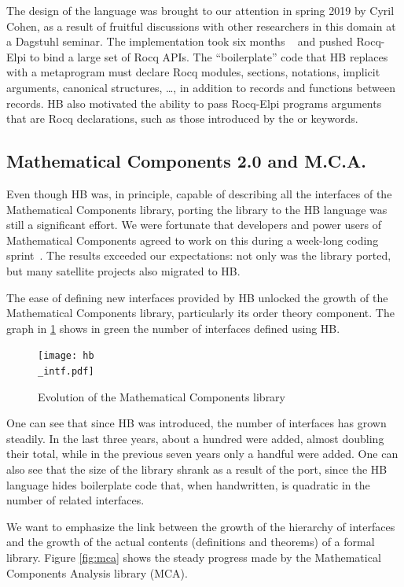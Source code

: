 \documentclass{these-ISSS}
\begin{document}
The design of the language was brought to our attention in spring 2019 by Cyril
Cohen, as a result of fruitful discussions with other researchers in this
domain at a Dagstuhl seminar. The implementation took six months
~\cite{cohen_et_al:LIPIcs.FSCD.2020.34} and pushed Rocq-Elpi to bind a large
set of Rocq APIs. The ``boilerplate'' code that HB replaces with a metaprogram
must declare Rocq modules, sections, notations, implicit arguments, canonical
structures, \ldots, in addition to records and functions between records. HB
also motivated the ability to pass Rocq-Elpi programs arguments that are Rocq
declarations, such as those introduced by the  or
 keywords.


\subsection{Mathematical Components 2.0 and M.C.A.}


Even though HB was, in principle, capable of describing all the interfaces of
the Mathematical Components library, porting the library to the HB language was
still a significant effort. We were fortunate that developers and power users
of Mathematical Components agreed to work on this during a week-long coding
sprint~\cite{affeldt:hal-03463762}. The results exceeded our expectations: not
only was the library ported, but many satellite projects also migrated to HB.

The ease of defining new interfaces provided by HB unlocked the growth of the
Mathematical Components library, particularly its order theory component. The
graph in \cref{fig:mc} shows in green the number of interfaces defined using
HB.
\begin{figure}[!ht]
\texttt{[image: hb\\\_intf.pdf]}
\caption{Evolution of the Mathematical Components library\label{fig:mc}}
\end{figure}
One can see that since HB was introduced, the number of interfaces has grown
steadily. In the last three years, about a hundred were added, almost doubling
their total, while in the previous seven years only a handful were added. One
can also see that the size of the library shrank as a result of the
port, since the HB language hides boilerplate code that, when handwritten, is
quadratic in the number of related interfaces.

We want to emphasize the link between the growth of the hierarchy of
interfaces and the growth of the actual contents (definitions and theorems) of
a formal library. Figure \ref{fig:mca} shows the steady progress made by the
Mathematical Components Analysis library (MCA).
\end{document}
